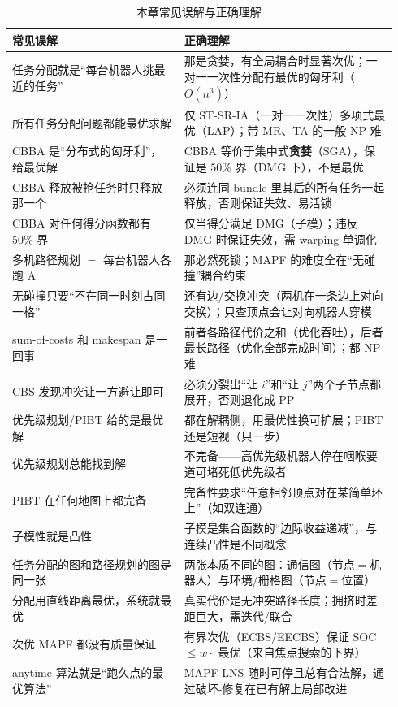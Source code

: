 \begin{table}[H]\centering\small
\caption{本章常见误解与正确理解}
\label{tab:mapf-misconceptions}
\begin{tabular}{p{0.42\linewidth}p{0.52\linewidth}}
\toprule
常见误解 & 正确理解 \\
\midrule
任务分配就是“每台机器人挑最近的任务” & 那是贪婪，有全局耦合时显著次优；一对一一次性分配有最优的匈牙利（$O(n^3)$） \\
所有任务分配问题都能最优求解 & 仅 ST-SR-IA（一对一一次性）多项式最优（LAP）；带 MR、TA 的一般 NP-难 \\
CBBA 是“分布式的匈牙利”，给最优解 & CBBA 等价于集中式\textbf{贪婪}（SGA），保证是 $50\%$ 界（DMG 下），不是最优 \\
CBBA 释放被抢任务时只释放那一个 & 必须连同 bundle 里其后的所有任务一起释放，否则保证失效、易活锁 \\
CBBA 对任何得分函数都有 $50\%$ 界 & 仅当得分满足 DMG（子模）；违反 DMG 时保证失效，需 warping 单调化 \\
多机路径规划 $=$ 每台机器人各跑 A\* & 那必然死锁；MAPF 的难度全在“无碰撞”耦合约束 \\
无碰撞只要“不在同一时刻占同一格” & 还有边/交换冲突（两机在一条边上对向交换）；只查顶点会让对向机器人穿模 \\
sum-of-costs 和 makespan 是一回事 & 前者各路径代价之和（优化吞吐），后者最长路径（优化全部完成时间）；都 NP-难 \\
CBS 发现冲突让一方避让即可 & 必须分裂出“让 $i$”和“让 $j$”两个子节点都展开，否则退化成 PP \\
优先级规划/PIBT 给的是最优解 & 都在解耦侧，用最优性换可扩展；PIBT 还是短视（只一步） \\
优先级规划总能找到解 & 不完备——高优先级机器人停在咽喉要道可堵死低优先级者 \\
PIBT 在任何地图上都完备 & 完备性要求“任意相邻顶点对在某简单环上”（如双连通） \\
子模性就是凸性 & 子模是集合函数的“边际收益递减”，与连续凸性是不同概念 \\
任务分配的图和路径规划的图是同一张 & 两张本质不同的图：通信图（节点$=$机器人）与环境/栅格图（节点$=$位置） \\
分配用直线距离最优，系统就最优 & 真实代价是无冲突路径长度；拥挤时差距巨大，需迭代/联合 \\
次优 MAPF 都没有质量保证 & 有界次优（ECBS/EECBS）保证 SOC $\le w\cdot$ 最优（来自焦点搜索的下界） \\
anytime 算法就是“跑久点的最优算法” & MAPF-LNS 随时可停且总有合法解，通过破坏-修复在已有解上局部改进 \\

\end{tabular}
\end{table}
